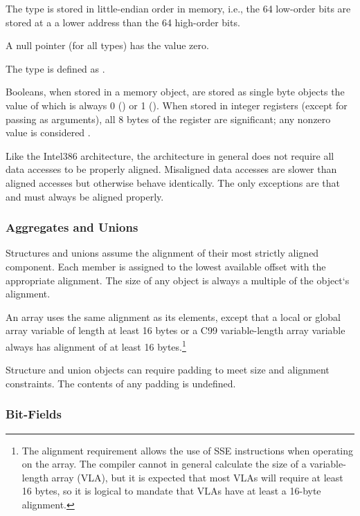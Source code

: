 The  type is stored in little-endian order in memory,
i.e., the 64 low-order bits are stored at a a lower address than the
64 high-order bits.

A null pointer (for all types) has the value zero.

The type  is defined as .

Booleans, when stored in a memory object, are stored as
single byte objects the value of which is always 0 () or 1
().  When stored in integer registers (except for passing
as arguments), all 8 bytes of the register are significant;
any nonzero value is considered .

Like the Intel386 architecture, the \xARCH architecture in general
does not require all data accesses to be properly aligned.  Misaligned
data accesses are slower than aligned accesses
but otherwise behave identically.  The only exceptions are that
 and  must always be aligned properly.

\subsubsection{Aggregates and Unions}

Structures and unions assume the alignment of their most strictly
aligned component.  Each member is assigned to the lowest available
offset with the appropriate alignment.  The size of any object is always
a multiple of the object`s alignment.

An array uses the same alignment as its elements, except that a local
or global array variable of length at least 16 bytes or a C99
variable-length array variable always has alignment
of at least 16 bytes.\footnote{The alignment requirement allows the
  use of SSE instructions when operating on the array.  The compiler
  cannot in general calculate the size of a variable-length array (VLA), but
  it is expected that most VLAs will require at least 16 bytes, so it
  is logical to mandate that VLAs have at least a 16-byte alignment.}

Structure and union objects can require padding to meet size and
alignment constraints.  The contents of any padding is undefined.


\subsubsection{Bit-Fields}

